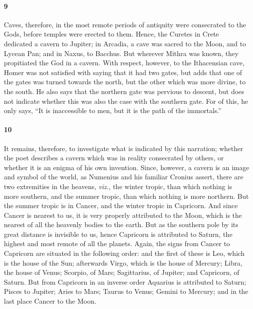 \documentclass[a4paper,12pt]{article}
\begin{document}
\paragraph{9} Caves, therefore, in the most remote periods of antiquity were
consecrated to the Gods, before temples were erected to them. Hence, the
Curetes in Crete dedicated a cavern to Jupiter; in Arcadia, a cave was sacred
to the Moon, and to Lycean Pan; and in Naxus, to Bacchus. But wherever Mithra
was known, they propitiated the God in a cavern. With respect, however, to the
Ithacensian cave, Homer was not satisfied with saying that it had two gates,
but adds that one of the gates was turned towards the north, but the other
which was more divine, to the south. He also says that the northern gate was
pervious to descent, but does not indicate whether this was also the case with
the southern gate. For of this, he only says, ``It is inaccessible to men, but
it is the path of the immortals.''


\paragraph{10} It remains, therefore, to investigate what is indicated by this
narration; whether the poet describes a cavern which was in reality consecrated
by others, or whether it is an enigma of his own invention. Since, however, a
cavern is an image and symbol of the world, as Numenius and his familiar
Cronius assert, there are two extremities in the heavens, \textit{viz.}, the winter
tropic, than which nothing is more southern, and the summer tropic, than which
nothing is more northern. But the summer tropic is in Cancer, and the winter
tropic in Capricorn. And since Cancer is nearest to us, it is very properly
attributed to the Moon, which is the nearest of all the heavenly bodies to the
earth. But as the southern pole by its great distance is invisible to us, hence
Capricorn is attributed to Saturn, the highest and most remote of all the
planets. Again, the signs from Cancer to Capricorn are situated in the
following order: and the first of these is Leo, which is the house of the Sun;
afterwards Virgo, which is the house of Mercury; Libra, the house of Venus;
Scorpio, of Mars; Sagittarius, of Jupiter; and Capricorn, of Saturn. But from
Capricorn in an inverse order Aquarius is attributed to Saturn; Pisces to
Jupiter; Aries to Mars; Taurus to Venus; Gemini to Mercury; and in the last
place Cancer to the Moon.
\end{document}

